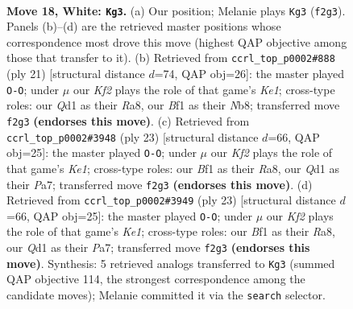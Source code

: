\documentclass[11pt]{article}
\begin{document}
\begin{figure}[p]
\label{fig:thought-m32}
\end{figure}

\clearpage

\begin{figure}[p]\centering
\begin{subfigure}{0.46\textwidth}\centering
\resizebox{\linewidth}{!}{%
\newchessgame
\chessboard[
  setfen={1nb1qrk1/1rp1nppp/1p2p3/1N1pP3/p2P1P2/8/PPP2KPP/R2Q1BNR w - - 2 18},
  showmover=false,
  pgfstyle=straightmove, color=movearrow, markmove={f2-g3}
]}
\caption{}
\end{subfigure}\hfill
\begin{subfigure}{0.46\textwidth}\centering
\resizebox{\linewidth}{!}{%
\newchessgame
\chessboard[
  setfen={rn1qk2r/1pp1bpp1/p3pn1p/3p4/2PP4/1P1NP3/PB3PPP/RN1Q1RK1 b kq - 0 11},
  showmover=false,
  pgfstyle=straightmove, color=movearrow, markmove={e8-g8}
]}
\caption{}
\end{subfigure}
\\[4pt]
\begin{subfigure}{0.46\textwidth}\centering
\resizebox{\linewidth}{!}{%
\newchessgame
\chessboard[
  setfen={r1b1k2r/pp1nqppp/2p1p3/3p4/2PP2P1/2Q1PN2/PP3P1P/2KR1BR1 b kq - 0 12},
  showmover=false,
  pgfstyle=straightmove, color=movearrow, markmove={e8-g8}
]}
\caption{}
\end{subfigure}\hfill
\begin{subfigure}{0.46\textwidth}\centering
\resizebox{\linewidth}{!}{%
\newchessgame
\chessboard[
  setfen={r1b1k2r/pp1nqppp/2p1p3/3p4/2PP2P1/2Q1PN2/PP3P1P/2KR1BR1 b kq - 0 12},
  showmover=false,
  pgfstyle=straightmove, color=movearrow, markmove={e8-g8}
]}
\caption{}
\end{subfigure}
\caption{\textbf{Move 18, White: \texttt{Kg3}.} (a) Our position; Melanie plays \texttt{Kg3} (\texttt{f2g3}). Panels (b)--(d) are the retrieved master positions whose correspondence most drove this move (highest QAP objective among those that transfer to it). (b) Retrieved from \texttt{ccrl\_top\_p0002\#888} (ply 21) [structural distance $d$=74, QAP obj=26]: the master played \texttt{O-O}; under $\mu$ our \emph{Kf2} plays the role of that game's \emph{Ke1}; cross-type roles: our \emph{Q}d1 as their \emph{R}a8, our \emph{B}f1 as their \emph{N}b8; transferred move \texttt{f2g3} \textbf{(endorses this move)}. (c) Retrieved from \texttt{ccrl\_top\_p0002\#3948} (ply 23) [structural distance $d$=66, QAP obj=25]: the master played \texttt{O-O}; under $\mu$ our \emph{Kf2} plays the role of that game's \emph{Ke1}; cross-type roles: our \emph{B}f1 as their \emph{R}a8, our \emph{Q}d1 as their \emph{P}a7; transferred move \texttt{f2g3} \textbf{(endorses this move)}. (d) Retrieved from \texttt{ccrl\_top\_p0002\#3949} (ply 23) [structural distance $d$=66, QAP obj=25]: the master played \texttt{O-O}; under $\mu$ our \emph{Kf2} plays the role of that game's \emph{Ke1}; cross-type roles: our \emph{B}f1 as their \emph{R}a8, our \emph{Q}d1 as their \emph{P}a7; transferred move \texttt{f2g3} \textbf{(endorses this move)}. Synthesis: 5 retrieved analogs transferred to \texttt{Kg3} (summed QAP objective 114, the strongest correspondence among the candidate moves); Melanie committed it via the \texttt{search} selector.}

\end{figure}
\end{document}
